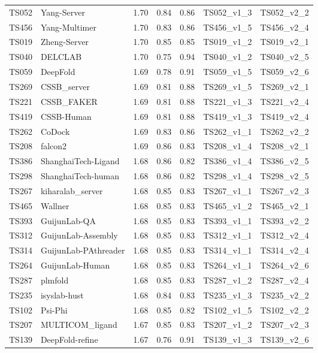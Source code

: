 \begin{table}[ht]
{\begin{tabular}{llrrrll}
TS052 & Yang-Server & 1.70 & 0.84 & 0.86 & TS052\_v1\_3 & TS052\_v2\_2 \\ 
TS456 & Yang-Multimer & 1.70 & 0.83 & 0.86 & TS456\_v1\_5 & TS456\_v2\_4 \\ 
TS019 & Zheng-Server & 1.70 & 0.85 & 0.85 & TS019\_v1\_2 & TS019\_v2\_1 \\ 
TS040 & DELCLAB & 1.70 & 0.75 & 0.94 & TS040\_v1\_2 & TS040\_v2\_5 \\ 
TS059 & DeepFold & 1.69 & 0.78 & 0.91 & TS059\_v1\_5 & TS059\_v2\_6 \\ 
TS269 & CSSB\_server & 1.69 & 0.81 & 0.88 & TS269\_v1\_5 & TS269\_v2\_1 \\ 
TS221 & CSSB\_FAKER & 1.69 & 0.81 & 0.88 & TS221\_v1\_3 & TS221\_v2\_4 \\ 
TS419 & CSSB-Human & 1.69 & 0.81 & 0.88 & TS419\_v1\_3 & TS419\_v2\_4 \\ 
TS262 & CoDock & 1.69 & 0.83 & 0.86 & TS262\_v1\_1 & TS262\_v2\_2 \\ 
TS208 & falcon2 & 1.69 & 0.86 & 0.83 & TS208\_v1\_4 & TS208\_v2\_1 \\ 
TS386 & ShanghaiTech-Ligand & 1.68 & 0.86 & 0.82 & TS386\_v1\_4 & TS386\_v2\_5 \\ 
TS298 & ShanghaiTech-human & 1.68 & 0.86 & 0.82 & TS298\_v1\_4 & TS298\_v2\_5 \\ 
TS267 & kiharalab\_server & 1.68 & 0.85 & 0.83 & TS267\_v1\_1 & TS267\_v2\_3 \\ 
TS465 & Wallner & 1.68 & 0.85 & 0.83 & TS465\_v1\_2 & TS465\_v2\_1 \\ 
TS393 & GuijunLab-QA & 1.68 & 0.85 & 0.83 & TS393\_v1\_1 & TS393\_v2\_2 \\ 
TS312 & GuijunLab-Assembly & 1.68 & 0.85 & 0.83 & TS312\_v1\_1 & TS312\_v2\_4 \\ 
TS314 & GuijunLab-PAthreader & 1.68 & 0.85 & 0.83 & TS314\_v1\_1 & TS314\_v2\_4 \\ 
TS264 & GuijunLab-Human & 1.68 & 0.85 & 0.83 & TS264\_v1\_1 & TS264\_v2\_6 \\ 
TS287 & plmfold & 1.68 & 0.85 & 0.83 & TS287\_v1\_2 & TS287\_v2\_4 \\ 
TS235 & isyslab-hust & 1.68 & 0.84 & 0.83 & TS235\_v1\_3 & TS235\_v2\_2 \\ 
TS102 & Psi-Phi & 1.68 & 0.85 & 0.82 & TS102\_v1\_5 & TS102\_v2\_2 \\ 
TS207 & MULTICOM\_ligand & 1.67 & 0.85 & 0.83 & TS207\_v1\_2 & TS207\_v2\_3 \\ 
TS139 & DeepFold-refine & 1.67 & 0.76 & 0.91 & TS139\_v1\_3 & TS139\_v2\_6 \\ 

\end{tabular}}
\end{table}
